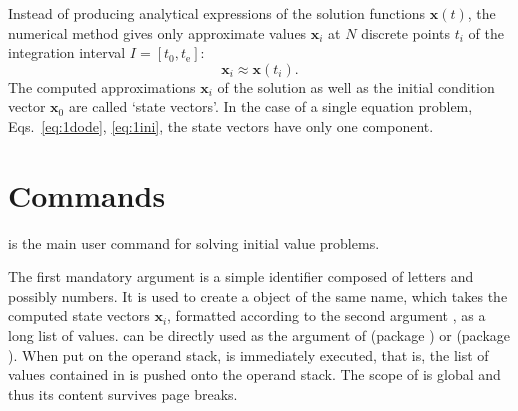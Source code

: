 \documentclass[11pt,english,BCOR10mm,DIV12,bibliography=totoc,parskip=false,smallheadings
    headexclude,footexclude,oneside,dvips,UKenglish]{pst-doc}
\begin{document}
Instead of producing analytical expressions of the solution functions $\mathbf{x}(t)$, the numerical method gives only approximate values $\mathbf{x}_i$ at $N$ discrete points $t_i$ of the integration interval $I=[t_0, t_\mathrm{e}]$:
\begin{equation}
\mathbf{x}_i\approx\mathbf{x}(t_i).
\end{equation}
The computed approximations $\mathbf{x}_i$ of the solution as well as the initial condition vector $\mathbf{x}_0$ are called `state vectors'. In the case of a single equation problem, Eqs.~\eqref{eq:1dode}, \eqref{eq:1ini}, the state vectors have only one component.

\section{Commands}
\begin{BDef}
	\OptArgs{}
\end{BDef}
is the main user command for solving initial value problems.

The first mandatory argument  is a simple identifier composed of letters and possibly numbers. It is used to create a \PS{} object of the same name, which takes the computed state vectors $\mathbf{x}_i$, formatted according to the second argument , as a long list of values.  can be directly used as the  argument of  (package ) or  (package ). When put on the \PS{} operand stack,  is immediately executed, that is, the list of values contained in  is pushed onto the operand stack. The scope of  is global and thus its content survives page breaks.
\end{document}
